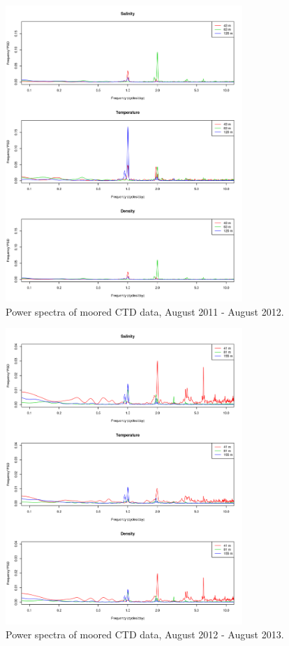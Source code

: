 \documentclass[12pt]{dforeport}
\begin{document}
\begin{figure}
\centering
\includegraphics[width = 0.8\textwidth]{./figures/10_mctd_ps_2011_2012.png}
\caption[Power spectra of moored CTD, 2011-2012]{Power spectra of moored CTD data, August 2011 - August 2012.}
\label{f:mctd_ps_2011_2012}
\end{figure}

\begin{figure}
\centering
\includegraphics[width = 0.8\textwidth]{./figures/11_mctd_ps_2012_2013.png}
\caption[Power spectra of moored CTD, 2012-2013]{Power spectra of moored CTD data, August 2012 - August 2013.}
\label{f:mctd_ps_2012_2013}
\end{figure}
\end{document}
